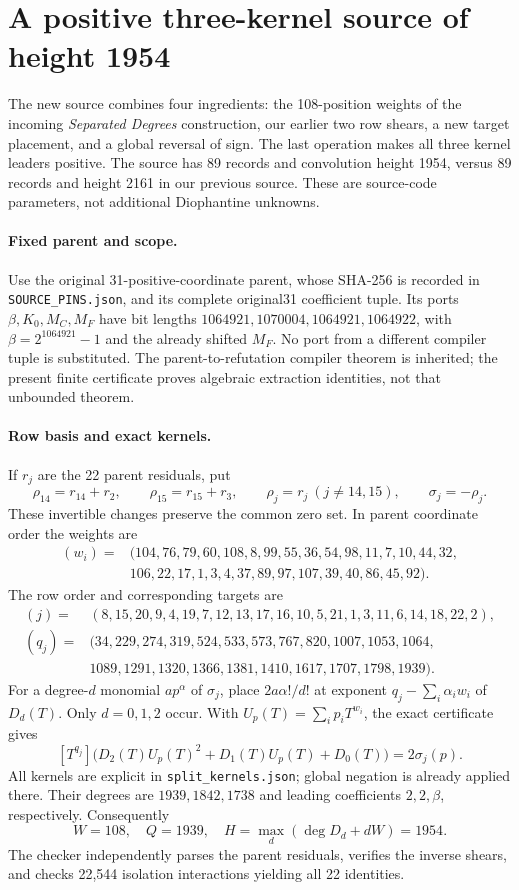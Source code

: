 \section{A positive three-kernel source of height 1954}
\label{sec:source108}
The new source combines four ingredients: the 108-position weights of the
incoming \emph{Separated Degrees} construction, our earlier two row shears,
a new target placement, and a global reversal of sign. The last operation
makes all three kernel leaders positive. The source has 89 records and
convolution height 1954, versus 89 records and height 2161 in our previous
source. These are source-code parameters, not additional Diophantine unknowns.

\paragraph{Fixed parent and scope.}
Use the original 31-positive-coordinate parent, whose SHA-256 is recorded
in \texttt{SOURCE\_PINS.json}, and its complete original31 coefficient tuple.
Its ports $\beta,K_0,M_C,M_F$ have bit lengths
$1064921,1070004,1064921,1064922$, with
$\beta=2^{1064921}-1$ and the already shifted $M_F$.
No port from a different compiler tuple is substituted.
The parent-to-refutation compiler theorem is inherited; the present finite
certificate proves algebraic extraction identities, not that unbounded theorem.

\paragraph{Row basis and exact kernels.}
If $r_j$ are the 22 parent residuals, put
\[
 \rho_{14}=r_{14}+r_2,\qquad \rho_{15}=r_{15}+r_3,
 \qquad \rho_j=r_j\ (j\ne14,15),\qquad \sigma_j=-\rho_j.
\]
These invertible changes preserve the common zero set. In parent coordinate
order the weights are
\[
\begin{split}
 (w_i)={}&(104,76,79,60,108,8,99,55,36,54,98,11,7,10,44,32,\\
 &106,22,17,1,3,4,37,89,97,107,39,40,86,45,92).
\end{split}
\]
The row order and corresponding targets are
\[
\begin{split}
(j)={}&(8,15,20,9,4,19,7,12,13,17,16,10,5,21,1,3,11,6,14,18,22,2),\\
(q_j)={}&(34,229,274,319,524,533,573,767,820,1007,1053,1064,\\
 &1089,1291,1320,1366,1381,1410,1617,1707,1798,1939).
\end{split}
\]
For a degree-$d$ monomial $a p^\alpha$ of $\sigma_j$, place
$2a\alpha!/d!$ at exponent $q_j-\sum_i\alpha_iw_i$ of $D_d(T)$.
Only $d=0,1,2$ occur. With $U_p(T)=\sum_i p_iT^{w_i}$, the exact certificate gives
\[
 [T^{q_j}]\bigl(D_2(T)U_p(T)^2+D_1(T)U_p(T)+D_0(T)\bigr)
 =2\sigma_j(p).
\]
All kernels are explicit in \texttt{split\_kernels.json}; global negation is
already applied there. Their degrees are $1939,1842,1738$ and leading
coefficients $2,2,\beta$, respectively. Consequently
\[
 W=108,\quad Q=1939,\quad H=\max_d(\deg D_d+dW)=1954.
\]
The checker independently parses the parent residuals, verifies the inverse
shears, and checks 22,544 isolation interactions yielding all 22 identities.

